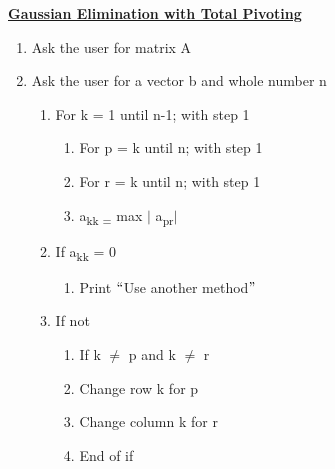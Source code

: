 \documentclass[12pt]{article}
\renewcommand{\_}{\kern-1.5pt\textunderscore\kern-1.5pt}
\begin{document}
\textbf{\uline{Gaussian Elimination with Total Pivoting}}\par


\vspace{\baselineskip}
\begin{enumerate}
	\item Ask the user for matrix A \par

	\item Ask the user for a vector b and whole number n\par

\begin{enumerate}
	\item For k = 1 until n-1; with step 1\par

\begin{enumerate}
	\item For p = k until n; with step 1\par

	\item For r = k until n; with step 1\par

	\item a\textsubscript{kk = }max $ \vert $ a\textsubscript{pr}$ \vert $ \par


\end{enumerate}
	\item If a\textsubscript{kk} = 0 \par

\begin{enumerate}
	\item Print $``$Use another method$"$ \par


\end{enumerate}
	\item If not \par

\begin{enumerate}
	\item If k $ \neq $  p and k $ \neq $  r\par

	\item Change row k for p\par

	\item Change column k for r\par

	\item End of if\par



\end{enumerate}
\end{enumerate}
\end{enumerate}
\end{document}
